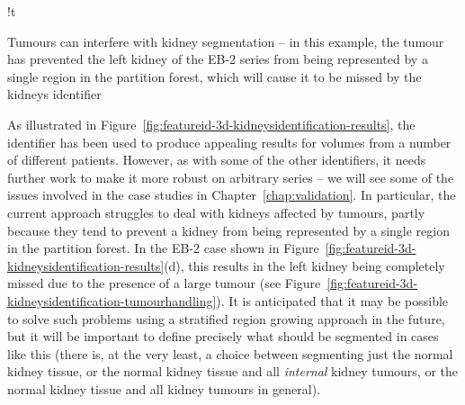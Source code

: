 \begin{stusubfig}{!t}
	\hspace{4mm}%
\caption{Tumours can interfere with kidney segmentation -- in this example, the tumour has prevented the left kidney of the EB-2 series from being represented by a single region in the partition forest, which will cause it to be missed by the kidneys identifier}
\label{fig:featureid-3d-kidneysidentification-tumourhandling}
\end{stusubfig}

\noindent As illustrated in Figure~\ref{fig:featureid-3d-kidneysidentification-results}, the identifier has been used to produce appealing results for volumes from a number of different patients. However, as with some of the other identifiers, it needs further work to make it more robust on arbitrary series -- we will see some of the issues involved in the case studies in Chapter~\ref{chap:validation}. In particular, the current approach struggles to deal with kidneys affected by tumours, partly because they tend to prevent a kidney from being represented by a single region in the partition forest. In the EB-2 case shown in Figure~\ref{fig:featureid-3d-kidneysidentification-results}(d), this results in the left kidney being completely missed due to the presence of a large tumour (see Figure~\ref{fig:featureid-3d-kidneysidentification-tumourhandling}). It is anticipated that it may be possible to solve such problems using a stratified region growing approach in the future, but it will be important to define precisely what should be segmented in cases like this (there is, at the very least, a choice between segmenting just the normal kidney tissue, or the normal kidney tissue and all \emph{internal} kidney tumours, or the normal kidney tissue and all kidney tumours in general).

